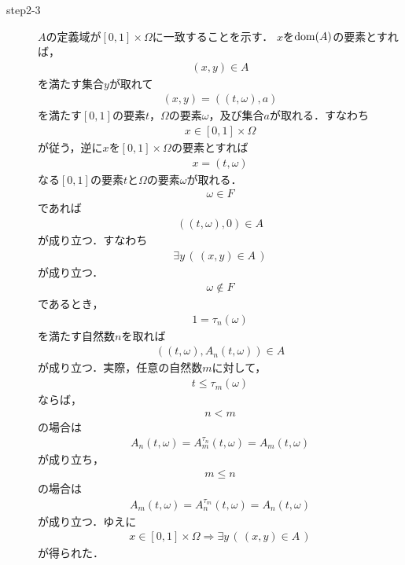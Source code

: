 \begin{sketch}
\begin{description}
			\item[step2-3]
				$A$の定義域が$[0,1] \times \Omega$に一致することを示す．
				$x$を$\operatorname*{dom} (A)$の要素とすれば，
				\begin{align}
					(x,y) \in A
				\end{align}
				を満たす集合$y$が取れて
				\begin{align}
					(x,y) = ((t,\omega),a)
				\end{align}
				を満たす$[0,1]$の要素$t$，$\Omega$の要素$\omega$，及び集合$a$が取れる．すなわち
				\begin{align}
					x \in [0,1] \times \Omega
				\end{align}
				が従う，逆に$x$を$[0,1] \times \Omega$の要素とすれば
				\begin{align}
					x = (t,\omega)
				\end{align}
				なる$[0,1]$の要素$t$と$\Omega$の要素$\omega$が取れる．
				\begin{align}
					\omega \in F
				\end{align}
				であれば
				\begin{align}
					((t,\omega),0) \in A
				\end{align}
				が成り立つ．すなわち
				\begin{align}
					\exists y\, \left(\, (x,y) \in A\, \right)
				\end{align}
				が成り立つ．
				\begin{align}
					\omega \notin F
				\end{align}
				であるとき，
				\begin{align}
					1 = \tau_{n}(\omega)
				\end{align}
				を満たす自然数$n$を取れば
				\begin{align}
					\left((t,\omega),A_{n}(t,\omega)\right) \in A
				\end{align}
				が成り立つ．実際，任意の自然数$m$に対して，
				\begin{align}
					t \leq \tau_{m}(\omega)
				\end{align}
				ならば，
				\begin{align}
					n < m
				\end{align}
				の場合は
				\begin{align}
					A_{n}(t,\omega) = A_{m}^{\tau_{n}}(t,\omega) = A_{m}(t,\omega)
				\end{align}
				が成り立ち，
				\begin{align}
					m \leq n
				\end{align}
				の場合は
				\begin{align}
					A_{m}(t,\omega) = A_{n}^{\tau_{m}}(t,\omega) = A_{n}(t,\omega)
				\end{align}
				が成り立つ．ゆえに
				\begin{align}
					x \in [0,1] \times \Omega \Longrightarrow 
					\exists y\, \left(\, (x,y) \in A\, \right)
				\end{align}
				が得られた．
				

\end{description}
\end{sketch}
